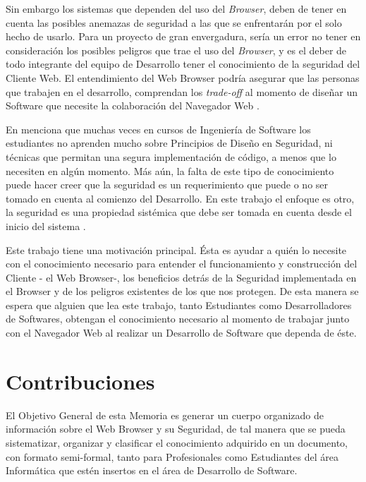 Sin embargo los sistemas que dependen del uso del \textit{Browser}, deben de tener en cuenta las posibles anemazas de seguridad a las que se enfrentarán por el solo hecho de usarlo. Para un proyecto de gran envergadura, sería un error no tener en consideración los posibles peligros que trae el uso del \textit{Browser}, y es el deber de todo integrante del equipo de Desarrollo tener el conocimiento de la seguridad del Cliente Web. El entendimiento del Web Browser podría asegurar que las personas que trabajen en el desarrollo, comprendan los \textit{trade-off} al momento de diseñar un Software que necesite la colaboración del Navegador Web \cite{2005-grosskurth-browser-refarch,preprint-grosskurth-browser-archevol}.

En \cite{goertzel2007software} menciona que muchas veces en cursos de Ingeniería de Software los estudiantes no aprenden mucho sobre Principios de Diseño en Seguridad, ni técnicas que permitan una segura implementación de código, a menos que lo necesiten en algún momento. Más aún, la falta de este tipo de conocimiento puede hacer creer que la seguridad es un requerimiento que puede o no ser tomado en cuenta al comienzo del Desarrollo. En este trabajo el enfoque es otro, la seguridad es una propiedad sistémica que debe ser tomada en cuenta desde el inicio del sistema \cite{fernandez2004methodology, fernandez2006defining, braz2008eliciting, fernandez2013security}.

Este trabajo tiene una motivación principal. Ésta es ayudar a quién lo necesite con el conocimiento necesario para entender el funcionamiento y construcción del Cliente - el Web Browser-, los beneficios detrás de la Seguridad implementada en el Browser y de los peligros existentes de los que nos protegen. De esta manera se espera que alguien que lea este trabajo, tanto Estudiantes como Desarrolladores de Softwares, obtengan el conocimiento necesario al momento de trabajar junto con el Navegador Web al realizar un Desarrollo de Software que dependa de éste.



\section{Contribuciones}
\label{chap1:contr}

El Objetivo General de esta Memoria es generar un cuerpo organizado de información sobre el Web Browser y su Seguridad, de tal manera que se pueda sistematizar, organizar y clasificar el conocimiento adquirido en un documento, con formato semi-formal, tanto para Profesionales como Estudiantes del área Informática que estén insertos en el área de Desarrollo de Software. 


